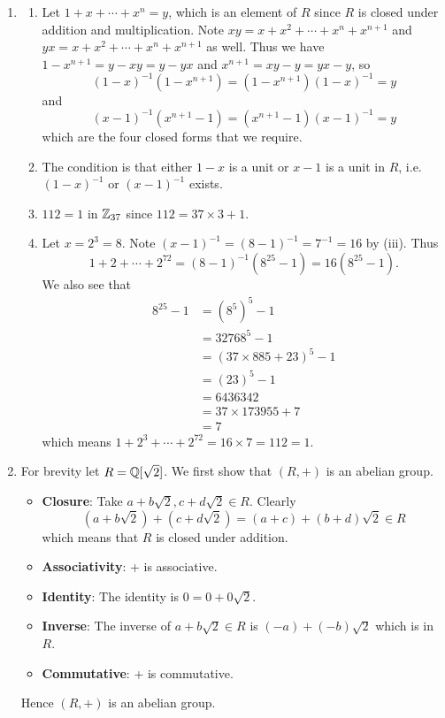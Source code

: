 \begin{enumerate}
    \item \begin{enumerate}[label=(\roman*)]
        \item Let $1 + x + \cdots + x^n = y$, which is an element of $R$ since $R$ is closed under addition and multiplication. Note $xy = x + x^2 + \cdots + x^n + x^{n+1}$ and $yx = x + x^2 + \cdots + x^n + x^{n+1}$ as well. Thus we have $1 - x^{n+1} = y - xy = y - yx$ and $x^{n+1} = xy - y = yx - y$, so
        \[
            (1-x)^{-1}(1-x^{n+1}) = (1-x^{n+1})(1-x)^{-1} = y
        \]
        and
        \[
            (x-1)^{-1}(x^{n+1}-1) = (x^{n+1}-1)(x-1)^{-1} = y
        \]
        which are the four closed forms that we require.
        \item The condition is that either $1-x$ is a unit or $x-1$ is a unit in $R$, i.e. $(1-x)^{-1}$ or $(x-1)^{-1}$ exists.
        \item $112 = 1$ in $\mathbb{Z}_{37}$ since $112 = 37\times3 + 1$.
        \item Let $x = 2^3 = 8$. Note $(x-1)^{-1} = (8-1)^{-1} = 7^{-1} = 16$ by (iii). Thus
        \[
            1+2+\cdots+2^{72} = (8-1)^{-1}(8^{25}-1) = 16(8^{25}-1).
        \]
        We also see that
        \begin{align*}
            8^{25}-1 &= \left(8^{5}\right)^{5} - 1\\
            &= 32768^5 - 1\\
            &= (37\times885 + 23)^5 - 1\\
            &= (23)^5 - 1\\
            &= 6436342\\
            &= 37\times173955 + 7\\
            &= 7
        \end{align*}
        which means $1+2^3+\cdots+2^{72} = 16 \times 7 = 112 = 1$.
    \end{enumerate}

    \item For brevity let $R = \mathbb{Q}[\sqrt2]$. We first show that $(R,+)$ is an abelian group.
    \begin{itemize}
        \item \textbf{Closure}: Take $a+b\sqrt2, c+d\sqrt2 \in R$. Clearly
        \[
            (a+b\sqrt2) + (c+d\sqrt2) = (a+c) + (b+d)\sqrt2 \in R
        \]
        which means that $R$ is closed under addition.
        \item \textbf{Associativity}: + is associative.
        \item \textbf{Identity}: The identity is $0 = 0 + 0\sqrt2$.
        \item \textbf{Inverse}: The inverse of $a+b\sqrt2 \in R$ is $(-a) + (-b)\sqrt2$ which is in $R$.
        \item \textbf{Commutative}: + is commutative.
    \end{itemize}
    Hence $(R, +)$ is an abelian group.


\end{enumerate}
